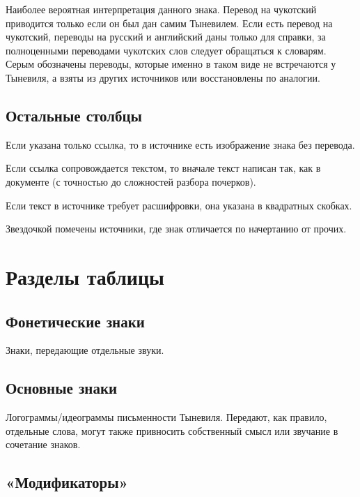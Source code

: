 \documentclass{article}
\begin{document}
Наиболее вероятная интерпретация данного знака. Перевод на чукотский приводится только если он был дан самим Тыневилем. Если есть перевод на чукотский, переводы на русский и английский даны только для справки, за полноценными переводами чукотских слов следует обращаться к словарям. Серым обозначены переводы, которые именно в таком виде не встречаются у Тыневиля, а взяты из других источников или восстановлены по аналогии.

\subsection{Остальные столбцы}

Если указана только ссылка, то в источнике есть изображение знака без перевода.

Если ссылка сопровождается текстом, то вначале текст написан так, как в документе (с точностью до сложностей разбора почерков). 

Если текст в источнике требует расшифровки, она указана в квадратных скобках. %


Звездочкой помечены источники, где знак отличается по начертанию от прочих.

\section{Разделы таблицы}

\subsection{Фонетические знаки} 

Знаки, передающие отдельные звуки.

\subsection{Основные знаки} 

Логограммы/идеограммы письменности Тыневиля. Передают, как правило, отдельные слова, могут также привносить собственный смысл или звучание в сочетание знаков.

\subsection{«Модификаторы»} 
\end{document}
